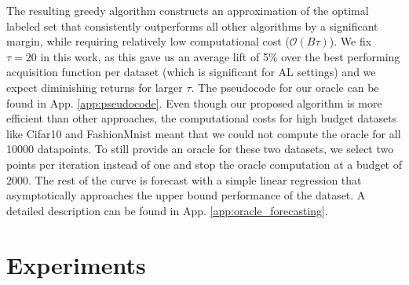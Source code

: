 \documentclass[]{article}
\newcommand{\LL}{\mathcal{L}}
\begin{document}
The resulting greedy algorithm constructs an approximation of the optimal labeled set that consistently outperforms all other algorithms by a significant margin, while requiring relatively low computational cost ($\mathcal{O}(B\tau)$).
We fix $\tau = 20$ in this work, as this gave us an average lift of 5\% over the best performing acquisition function per dataset (which is significant for AL settings) and we expect diminishing returns for larger $\tau$.
The pseudocode for our oracle can be found in App. \ref{app:pseudocode}.
Even though our proposed algorithm is more efficient than other approaches, the computational costs for high budget datasets like Cifar10 and FashionMnist meant that we could not compute the oracle for all 10000 datapoints.
To still provide an oracle for these two datasets, we select two points per iteration instead of one and stop the oracle computation at a budget of 2000.
The rest of the curve is forecast with a simple linear regression that asymptotically approaches the upper bound performance of the dataset. 
A detailed description can be found in App. \ref{app:oracle_forecasting}.


\section{Experiments}
\end{document}
